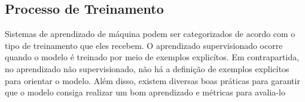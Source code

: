 
            

                
    \subsection{Processo de Treinamento}
        Sistemas de aprendizado de máquina podem ser categorizados de acordo com o tipo de treinamento que
        eles recebem. O aprendizado supervisionado ocorre quando o modelo é treinado por meio de exemplos explicítos. 
        Em contrapartida, no aprendizado não supervisionado, não há a definição de exemplos explicítos para orientar o 
        modelo. Além disso, existem diversas boas práticas para garantir que o modelo consiga realizar um bom aprendizado 
        e métricas para avalia-lo
         
